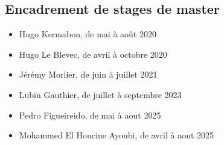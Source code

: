 \documentclass[11pt]{report}
\begin{document}
\subsection{Encadrement de stages de master}
\begin{itemize}
    \item Hugo Kermabon, de mai à août 2020
    \item Hugo Le Blevec, de avril à octobre 2020
    \item Jérémy Morlier, de juin à juillet 2021
    \item Lubin Gauthier, de juillet à septembre 2023
    \item Pedro Figueireido, de mai à aout 2025
    \item Mohammed El Houcine Ayoubi, de avril à aout 2025
\end{itemize}
\end{document}
